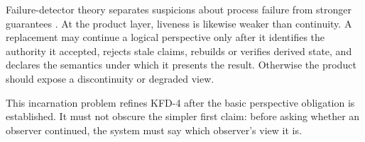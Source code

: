 Failure-detector theory separates suspicions about process failure from
stronger guarantees \cite{chandra1996failure}. At the product layer, liveness
is likewise weaker than continuity. A replacement may continue a logical
perspective only after it identifies the authority it accepted, rejects stale
claims, rebuilds or verifies derived state, and declares the semantics under
which it presents the result. Otherwise the product should expose a
discontinuity or degraded view.

This incarnation problem refines KFD-4 after the basic perspective obligation
is established. It must not obscure the simpler first claim: before asking
whether an observer continued, the system must say which observer's view it is.
